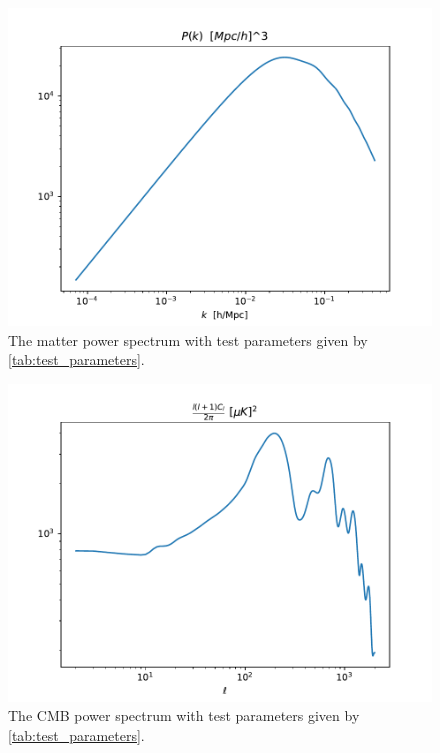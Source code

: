 \documentclass{aa}
\begin{document}
\begin{figure}[h!]
   \includegraphics[scale=0.6]{../figures/milestone4/matter_test.pdf}
   \caption{The matter power spectrum with test parameters given by \ref{tab:test_parameters}.}\label{fig:m4_matter_test}
\end{figure}

\begin{figure}[h!]
   \includegraphics[scale=0.6]{../figures/milestone4/cell_test.pdf}
   \caption{The CMB power spectrum with test parameters given by \ref{tab:test_parameters}.}\label{fig:m4_cell_test}
\end{figure}
\end{document}
